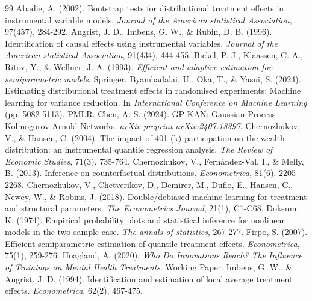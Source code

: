 \documentclass[final,3p,fleqn, 10pt]{elsarticle}
\begin{document}
\vskip 0.2in
\begin{thebibliography}{99}
 Abadie, A. (2002). Bootstrap tests for distributional treatment effects in instrumental variable models. \textit{Journal of the American statistical Association}, 97(457), 284-292.
 Angrist, J. D., Imbens, G. W., \& Rubin, D. B. (1996). Identification of causal effects using instrumental variables. \textit{Journal of the American statistical Association}, 91(434), 444-455.
 Bickel, P. J., Klaassen, C. A., Ritov, Y., \& Wellner, J. A. (1993). \textit{Efficient and adaptive estimation for semiparametric models}. Springer.
 Byambadalai, U., Oka, T., \& Yasui, S. (2024). Estimating distributional treatment effects in randomised experiments: Machine learning for variance reduction. In \textit{International Conference on Machine Learning} (pp. 5082-5113). PMLR.
 Chen, A. S. (2024). GP-KAN: Gaussian Process Kolmogorov-Arnold Networks. \textit{arXiv preprint arXiv:2407.18397}.
 Chernozhukov, V., \& Hansen, C. (2004). The impact of 401 (k) participation on the wealth distribution: an instrumental quantile regression analysis. \textit{The Review of Economic Studies}, 71(3), 735-764.
 Chernozhukov, V., Fern{\'a}ndez-Val, I., \& Melly, B. (2013). Inference on counterfactual distributions. \textit{Econometrica}, 81(6), 2205-2268.
 Chernozhukov, V., Chetverikov, D., Demirer, M., Duflo, E., Hansen, C., Newey, W., \& Robins, J. (2018). Double/debiased machine learning for treatment and structural parameters. \textit{The Econometrics Journal}, 21(1), C1-C68.
 Doksum, K. (1974). Empirical probability plots and statistical inference for nonlinear models in the two-sample case. \textit{The annals of statistics}, 267-277.
 Firpo, S. (2007). Efficient semiparametric estimation of quantile treatment effects. \textit{Econometrica}, 75(1), 259-276.
 Hoagland, A. (2020). \textit{Who Do Innovations Reach? The Influence of Trainings on Mental Health Treatments}. Working Paper.
 Imbens, G. W., \& Angrist, J. D. (1994). Identification and estimation of local average treatment effects. \textit{Econometrica}, 62(2), 467-475.

\end{thebibliography}
\end{document}
